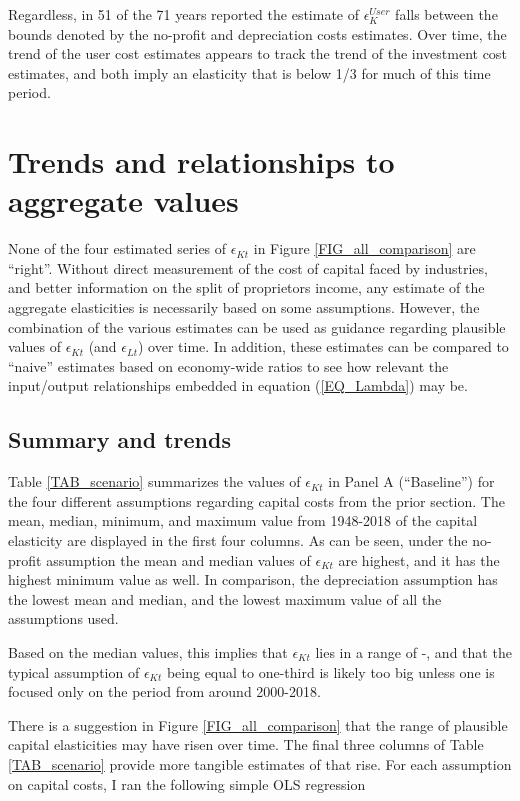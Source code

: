 \documentclass[11pt]{article}
\begin{document}
Regardless, in 51 of the 71 years reported the estimate of $\epsilon_K^{User}$ falls between the bounds denoted by the no-profit and depreciation costs estimates. Over time, the trend of the user cost estimates appears to track the trend of the investment cost estimates, and both imply an elasticity that is below 1/3 for much of this time period. 

\section{Trends and relationships to aggregate values}\label{SEC_trends}
None of the four estimated series of $\epsilon_{Kt}$ in Figure \ref{FIG_all_comparison} are ``right''. Without direct measurement of the cost of capital faced by industries, and better information on the split of proprietors income, any estimate of the aggregate elasticities is necessarily based on some assumptions. However, the combination of the various estimates can be used as guidance regarding plausible values of $\epsilon_{Kt}$ (and $\epsilon_{Lt}$) over time. In addition, these estimates can be compared to ``naive'' estimates based on economy-wide ratios to see how relevant the input/output relationships embedded in equation (\ref{EQ_Lambda}) may be.

\subsection{Summary and trends}
Table \ref{TAB_scenario} summarizes the values of $\epsilon_{Kt}$ in Panel A (``Baseline'') for the four different assumptions regarding capital costs from the prior section. The mean, median, minimum, and maximum value from 1948-2018 of the capital elasticity are displayed in the first four columns. As can be seen, under the no-profit assumption the mean and median values of $\epsilon_{Kt}$ are highest, and it has the highest minimum value as well. In comparison, the depreciation assumption has the lowest mean and median, and the lowest maximum value of all the assumptions used. 

Based on the median values, this implies that $\epsilon_{Kt}$ lies in a range of \basemeddepr-\basemednoprofit, and that the typical assumption of $\epsilon_{Kt}$ being equal to one-third is likely too big unless one is focused only on the period from around 2000-2018.

There is a suggestion in Figure \ref{FIG_all_comparison} that the range of plausible capital elasticities may have risen over time. The final three columns of Table \ref{TAB_scenario} provide more tangible estimates of that rise. For each assumption on capital costs, I ran the following simple OLS regression
\end{document}
